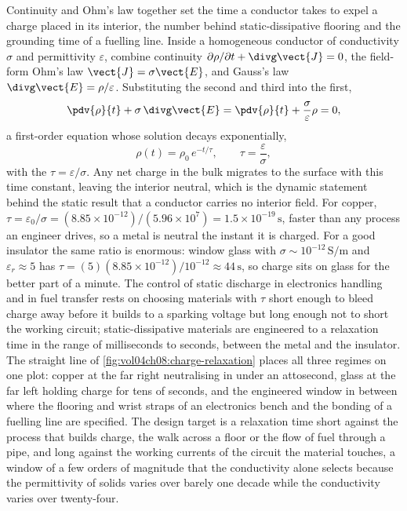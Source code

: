 Continuity and Ohm's law together set the time a conductor takes to expel
a charge placed in its interior, the number behind static-dissipative
flooring and the grounding time of a fuelling line. Inside a homogeneous
conductor of conductivity $\sigma$ and permittivity $\varepsilon$,
combine continuity $\partial\rho/\partial t + \divg\vect{J} = 0$, the
field-form Ohm's law $\vect{J} = \sigma\vect{E}$, and Gauss's law
$\divg\vect{E} = \rho/\varepsilon$. Substituting the second and third
into the first,
\[
\pdv{\rho}{t} + \sigma\,\divg\vect{E} = \pdv{\rho}{t} +
\frac{\sigma}{\varepsilon}\rho = 0,
\]
a first-order equation whose solution decays exponentially,
\[
\rho(t) = \rho_0\,e^{-t/\tau}, \qquad \tau = \frac{\varepsilon}{\sigma},
\]
with the  $\tau = \varepsilon/\sigma$.
Any net charge in the bulk migrates to the surface with this time
constant, leaving the interior neutral, which is the dynamic statement
behind the static result that a conductor carries no interior field. For
copper, $\tau = \varepsilon_0/\sigma = (8.85\times 10^{-12})/(5.96\times
10^{7}) = 1.5\times 10^{-19}\,\si{\second}$, faster than any process an
engineer drives, so a metal is neutral the instant it is charged. For a
good insulator the same ratio is enormous: window glass with $\sigma\sim
10^{-12}\,\si{\siemens\per\meter}$ and $\varepsilon_r\approx 5$ has
$\tau = (5)(8.85\times 10^{-12})/10^{-12} \approx 44\,\si{\second}$, so
charge sits on glass for the better part of a minute. The control of
static discharge in electronics handling and in fuel transfer rests on
choosing materials with $\tau$ short enough to bleed charge away before it
builds to a sparking voltage but long enough not to short the working
circuit; static-dissipative materials are engineered to a relaxation time
in the range of milliseconds to seconds, between the metal and the
insulator. The straight line of \cref{fig:vol04ch08:charge-relaxation}
places all three regimes on one plot: copper at the far right neutralising
in under an attosecond, glass at the far left holding charge for tens of
seconds, and the engineered window in between where the flooring and wrist
straps of an electronics bench and the bonding of a fuelling line are
specified. The design target is a relaxation time short against the process
that builds charge, the walk across a floor or the flow of fuel through a
pipe, and long against the working currents of the circuit the material
touches, a window of a few orders of magnitude that the conductivity alone
selects because the permittivity of solids varies over barely one decade
while the conductivity varies over twenty-four.

